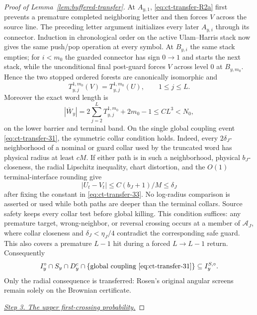 \begin{proof}[Proof of Lemma~\ref{lem:buffered-transfer}]
At $A_{y,1}$, \eqref{eq:ct-transfer-R2a} first prevents a premature completed neighboring
letter and then forces $V$ across the source line.  The preceding
letter argument initializes every later $A_{y,i}$ through its connector.
Induction in chronological order on the active Ulam--Harris stack now
gives the same push/pop operation at every symbol.  At $B_{y,i}$ the
same stack empties; for $i<m_0$ the guarded connector has sign $0\to1$
and starts the next stack, while the unconditional final post-guard forces
$V$ across level $0$ at $B_{y,m_0}$.  Hence the two stopped ordered
forests are canonically isomorphic and
\begin{equation}
T_{y,j}^{1,m_0}(V)=T_{y,j}^{1,m_0}(U),\qquad1\le j\le L.\label{eq:ct-transfer-R4}
\end{equation}
Moreover the exact word length is
\begin{equation}
|\overline W_y|=2\sum_{j=2}^{L}T_{y,j}^{1,m_0}+2m_0-1
       \le CL^3<N_0,\label{eq:ct-transfer-R4a}
\end{equation}
on the lower barrier and terminal band.  On the single global coupling
event \eqref{eq:ct-transfer-31}, the symmetric collar condition holds.  Indeed, every
$2\delta_J$-neighborhood of a nominal or guard collar used by the
truncated word has physical radius at least $cM$.  If either path is in
such a neighborhood, physical $b_J$-closeness, the radial Lipschitz
inequality, chart distortion, and the $O(1)$ terminal-interface rounding
give
\[
|U_t-V_t|\le C(b_J+1)/M\le\delta_J
\]
after fixing the constant in \eqref{eq:ct-transfer-33}.  No log-radius comparison is asserted or
used while both paths are deeper than the terminal collars.  Source safety
keeps every collar test before global killing.  This condition suffices:
any premature target, wrong-neighbor, or reversal crossing occurs at a
member of $\mathcal A_J$, where collar closeness and
$\delta_J<\eta_J/4$ contradict the corresponding safe guard.  This also
covers a premature $L-1$ hit during a forced $L\to L-1$ return.
Consequently
\begin{equation}
I_y^{\circ}\cap S_y\cap D_y^c\cap\{\text{global coupling \eqref{eq:ct-transfer-31}}\}
       \subseteq I_y^{S,\circ}.\label{eq:ct-transfer-R4b}
\end{equation}
Only the radial consequence is transferred: Rosen's original angular
screens remain solely on the Brownian certificate.

\smallskip\noindent
\underline{\textit{Step 3. The upper first-crossing probability.}}


\end{proof}
